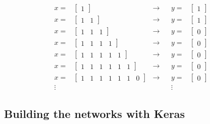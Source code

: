 \begin{align}\label{eq:sequence_to_probability_inputs_outputs_example}
x = & \begin{bmatrix} 1 \end{bmatrix} &\to & & 
y = & \begin{bmatrix} 1 \end{bmatrix} \nonumber \\
x = & \begin{bmatrix} 1 & 1 \end{bmatrix} &\to & & 
y = & \begin{bmatrix} 1 \end{bmatrix} \nonumber \\
x = & \begin{bmatrix} 1 & 1 & 1 \end{bmatrix} &\to & & 
y = & \begin{bmatrix} 0 \end{bmatrix} \nonumber \\
x = & \begin{bmatrix} 1 & 1 & 1 & 1 \end{bmatrix} &\to & & 
y = & \begin{bmatrix} 0 \end{bmatrix} \\
x = & \begin{bmatrix} 1 & 1 & 1 & 1 & 1 \end{bmatrix} &\to & & 
y = & \begin{bmatrix} 0 \end{bmatrix} \nonumber \\
x = & \begin{bmatrix} 1 & 1 & 1 & 1 & 1 & 1\end{bmatrix} &\to & & 
y = & \begin{bmatrix} 0 \end{bmatrix} \nonumber \\
x = & \begin{bmatrix} 1 & 1 & 1 & 1 & 1 & 1 & 0 \end{bmatrix} &\to & & 
y = & \begin{bmatrix} 0 \end{bmatrix} \nonumber \\
\vdots & & & &\vdots \nonumber
\end{align}

\subsection{Building the networks with Keras}

